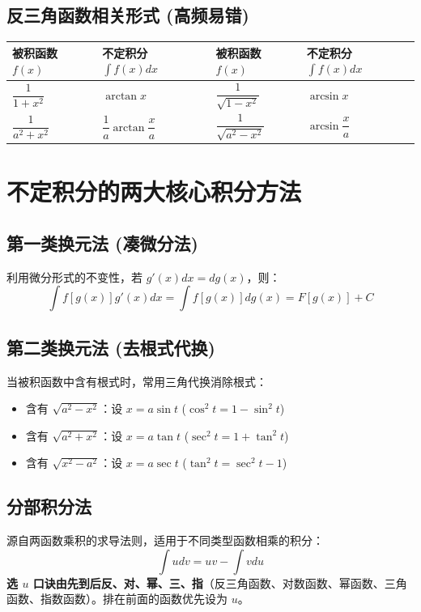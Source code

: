 \documentclass{article}
\begin{document}
\subsection{反三角函数相关形式 (高频易错)}
\begin{table}[h]
\centering
\begin{tabular}{ll|ll}
\toprule
\textbf{被积函数 $f(x)$} & \textbf{不定积分 $\int f(x)dx$} & \textbf{被积函数 $f(x)$} & \textbf{不定积分 $\int f(x)dx$} \\
\midrule
$\dfrac{1}{1+x^2}$ & $\arctan x$ & $\dfrac{1}{\sqrt{1-x^2}}$ & $\arcsin x$ \\
$\dfrac{1}{a^2+x^2}$ & $\dfrac{1}{a} \arctan \dfrac{x}{a}$ & $\dfrac{1}{\sqrt{a^2-x^2}}$ & $\arcsin \dfrac{x}{a}$ \\
\bottomrule
\end{tabular}
\end{table}

\section{不定积分的两大核心积分方法}

\subsection{第一类换元法 (凑微分法)}
利用微分形式的不变性，若 $g'(x)dx = dg(x)$，则：
\[ \int f[g(x)]g'(x)dx = \int f[g(x)]dg(x) = F[g(x)] + C \]

\subsection{第二类换元法 (去根式代换)}
当被积函数中含有根式时，常用三角代换消除根式：
\begin{itemize}[leftmargin=1.5em, itemsep=0.1em]
    \item 含有 $\sqrt{a^2-x^2}$：设 $x = a\sin t$ \quad ($\cos^2 t = 1 - \sin^2 t$)
    \item 含有 $\sqrt{a^2+x^2}$：设 $x = a\tan t$ \quad ($\sec^2 t = 1 + \tan^2 t$)
    \item 含有 $\sqrt{x^2-a^2}$：设 $x = a\sec t$ \quad ($\tan^2 t = \sec^2 t - 1$)
\end{itemize}

\subsection{分部积分法}
源自两函数乘积的求导法则，适用于不同类型函数相乘的积分：
\[ \int u dv = uv - \int v du \]
\textbf{选 $u$ 口诀由先到后反、对、幂、三、指}（反三角函数、对数函数、幂函数、三角函数、指数函数）。排在前面的函数优先设为 $u$。
\end{document}
